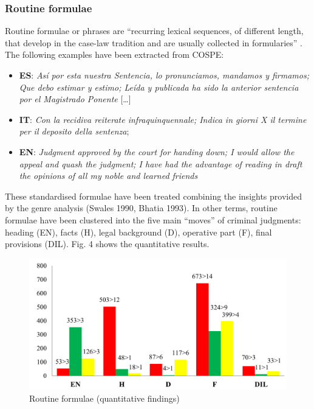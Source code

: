 \documentclass[output=paper]{LSP/langsci}
\begin{document}
\subsubsection{Routine formulae}
Routine formulae or phrases are “recurring lexical sequences, of different length, that develop in the case-law tradition and are usually collected in formularies” \citep[28-29]{Kjær1990}. The following examples have been extracted from COSPE:

\begin{itemize}
\item \textbf{ES}: \textit{Así por esta nuestra Sentencia, lo pronunciamos, mandamos y firmamos; Que debo estimar y estimo; Leída y publicada ha sido la anterior sentencia por el Magistrado Ponente} […]
\item \textbf{IT}: \textit{Con la recidiva reiterate infraquinquennale; Indica in giorni X il termine per il deposito della sentenza};
\item \textbf{EN}: \textit{Judgment approved by the court for handing down; I would allow the appeal and quash the judgment; I have had the advantage of reading in draft the opinions of all my noble and learned friends}
\end{itemize}

These standardised formulae have been treated combining the insights provided by the genre analysis (Swales 1990, Bhatia 1993). In other terms, routine formulae have been clustered into the five main “moves” of criminal judgments: heading (EN), facts (H), legal background (D), operative part (F), final provisions (DIL). Fig. 4 shows the quantitative results.

\begin{figure}
\includegraphics[width=1.0\textwidth]{./figures/1-4.png}
\caption{Routine formulae (quantitative findings)}
\end{figure}
\end{document}
